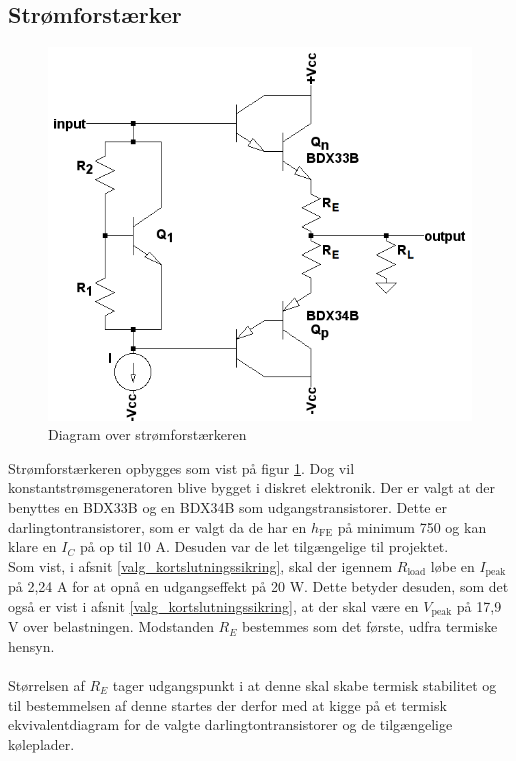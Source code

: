 \subsection*{Strømforstærker}
\label{effekt_stroemforstaerker}

\begin{figure}[h]
\centering
\includegraphics[scale=0.4]{teknisk/effektforstaerker/blokdiagram-stroemforstaerker.png}
\caption{Diagram over strømforstærkeren}
\label{fig:blokdiagram-stroem}
\end{figure}

Strømforstærkeren opbygges som vist på figur \ref{fig:blokdiagram-stroem}. Dog vil konstantstrømsgeneratoren blive bygget i diskret elektronik. Der er valgt at der benyttes en BDX33B og en BDX34B  som udgangstransistorer. Dette er darlingtontransistorer, som er valgt da de har en $h_{\mathrm{FE}}$ på minimum 750 og kan klare en $I_C$ på op til 10 A. Desuden var de let tilgængelige til projektet.\\
Som vist, i afsnit \ref{valg_kortslutningssikring}, skal der igennem $R_{\mathrm{load}}$ løbe en $I_{\mathrm{peak}}$ på 2,24 A for at opnå en udgangseffekt på 20 W. Dette betyder desuden, som det også er vist i afsnit \ref{valg_kortslutningssikring}, at der skal være en $V_{\mathrm{peak}}$ på 17,9 V over belastningen. %
Modstanden $R_E$ bestemmes som det første, udfra termiske hensyn.\\\\
Størrelsen af $R_E$ tager udgangspunkt i at denne skal skabe termisk stabilitet og til bestemmelsen af denne startes der derfor med at kigge på et termisk ekvivalentdiagram for de valgte darlingtontransistorer og de tilgængelige køleplader. 

